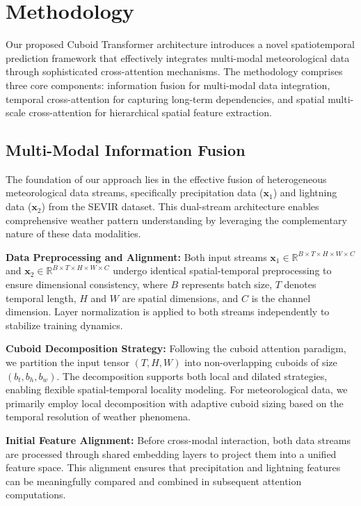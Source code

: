 \section{Methodology}

Our proposed Cuboid Transformer architecture introduces a novel spatiotemporal prediction framework that effectively integrates multi-modal meteorological data through sophisticated cross-attention mechanisms. The methodology comprises three core components: information fusion for multi-modal data integration, temporal cross-attention for capturing long-term dependencies, and spatial multi-scale cross-attention for hierarchical spatial feature extraction.

\subsection{Multi-Modal Information Fusion}

The foundation of our approach lies in the effective fusion of heterogeneous meteorological data streams, specifically precipitation data ($\mathbf{x}_1$) and lightning data ($\mathbf{x}_2$) from the SEVIR dataset. This dual-stream architecture enables comprehensive weather pattern understanding by leveraging the complementary nature of these data modalities.

\textbf{Data Preprocessing and Alignment:} Both input streams $\mathbf{x}_1 \in \mathbb{R}^{B \times T \times H \times W \times C}$ and $\mathbf{x}_2 \in \mathbb{R}^{B \times T \times H \times W \times C}$ undergo identical spatial-temporal preprocessing to ensure dimensional consistency, where $B$ represents batch size, $T$ denotes temporal length, $H$ and $W$ are spatial dimensions, and $C$ is the channel dimension. Layer normalization is applied to both streams independently to stabilize training dynamics.

\textbf{Cuboid Decomposition Strategy:} Following the cuboid attention paradigm, we partition the input tensor $(T, H, W)$ into non-overlapping cuboids of size $(b_t, b_h, b_w)$. The decomposition supports both local and dilated strategies, enabling flexible spatial-temporal locality modeling. For meteorological data, we primarily employ local decomposition with adaptive cuboid sizing based on the temporal resolution of weather phenomena.

\textbf{Initial Feature Alignment:} Before cross-modal interaction, both data streams are processed through shared embedding layers to project them into a unified feature space. This alignment ensures that precipitation and lightning features can be meaningfully compared and combined in subsequent attention computations.


